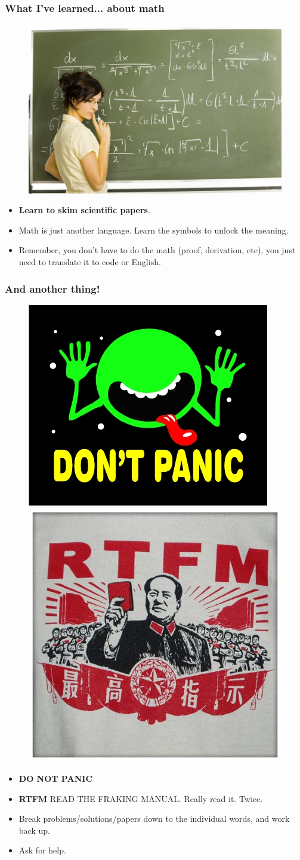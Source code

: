 \documentclass[compress]{beamer}
\begin{document}
\begin{frame}
   \frametitle{What I've learned... about math}
   \begin{figure}
     \includegraphics[width=0.5\linewidth]{math.jpg}
   \end{figure}

   \begin{itemize}
   \item \textbf{Learn to skim scientific papers}. 
     \item Math is just another language. Learn the symbols to unlock the meaning.
     
     \item Remember, you don't have to do the math (proof, derivation, etc), you just need to translate it to code or English. 
   \end{itemize}
 \end{frame}

\begin{frame}
   \frametitle{And another thing!}
   \begin{figure}
     \includegraphics[width=0.3\linewidth]{DontPanic.jpg}
     \quad 
     \includegraphics[width=0.3\linewidth]{rtfm.jpg}
   \end{figure}

   \begin{itemize}
   \item \textbf{DO NOT PANIC}
   \item \textbf{RTFM} READ THE FRAKING MANUAL. Really read it. Twice. 
   \item Break problems/solutions/papers down to the individual words, and work back up. 
   \item Ask for help.

   \end{itemize}
 \end{frame}
\end{document}
